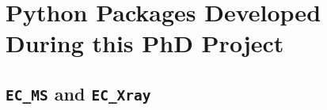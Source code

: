 
\appendix
	
	
	
	
	\chapter{Python Packages Developed During this PhD Project}
		\section{\texttt{EC\_MS} and \texttt{EC\_Xray}}
